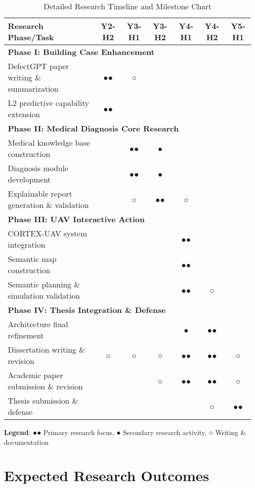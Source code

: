 \begin{table}[H]
\centering
\caption{Detailed Research Timeline and Milestone Chart}
\label{tab:detailed-gantt}
\begin{tabular}{|l|c|c|c|c|c|c|}
\hline
\textbf{Research Phase/Task} & \textbf{Y2-H2} & \textbf{Y3-H1} & \textbf{Y3-H2} & \textbf{Y4-H1} & \textbf{Y4-H2} & \textbf{Y5-H1} \\
\hline
\multicolumn{7}{|l|}{\textbf{Phase I: Building Case Enhancement}} \\
\hline
DefectGPT paper writing \& summarization & ●● & ○ &  &  &  &  \\
\hline
L2 predictive capability extension & ●● &  &  &  &  &  \\
\hline
\multicolumn{7}{|l|}{\textbf{Phase II: Medical Diagnosis Core Research}} \\
\hline
Medical knowledge base construction &  & ●● & ● &  &  &  \\
\hline
Diagnosis module development &  & ●● & ● &  &  &  \\
\hline
Explainable report generation \& validation &  & ○ & ●● & ○ &  &  \\
\hline
\multicolumn{7}{|l|}{\textbf{Phase III: UAV Interactive Action}} \\
\hline
CORTEX-UAV system integration &  &  &  & ●● &  &  \\
\hline
Semantic map construction &  &  &  & ●● &  &  \\
\hline
Semantic planning \& simulation validation &  &  &  & ●● & ○ &  \\
\hline
\multicolumn{7}{|l|}{\textbf{Phase IV: Thesis Integration \& Defense}} \\
\hline
Architecture final refinement &  &  &  & ● & ●● &  \\
\hline
Dissertation writing \& revision & ○ & ○ & ○ & ●● & ●● & ○ \\
\hline
Academic paper submission \& revision &  &  & ○ & ●● & ●● & ○ \\
\hline
Thesis submission \& defense &  &  &  &  & ○ & ●● \\
\hline
\end{tabular}
\end{table}

\textbf{Legend}: ●● Primary research focus, ● Secondary research activity, ○ Writing \& documentation

\section{Expected Research Outcomes}

